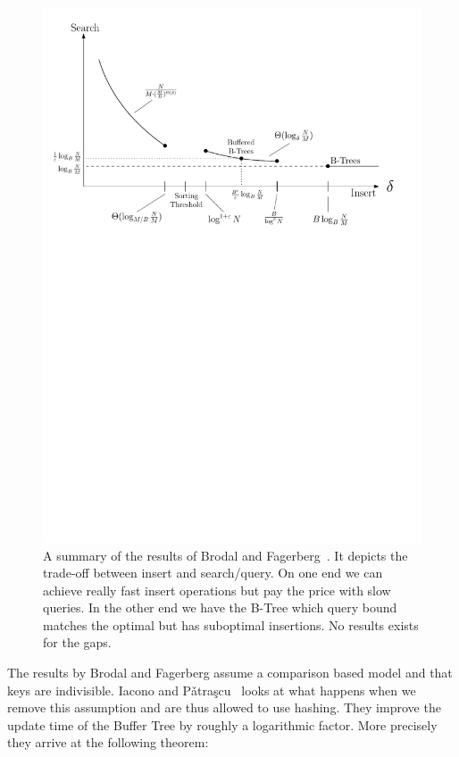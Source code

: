 \documentclass[twoside,11pt,openright]{report}
\begin{document}
\begin{figure}[t]
\centering
\includegraphics[width=\textwidth]{../figures/lower_bound_summary}
\caption{A summary of the results of Brodal and Fagerberg~\cite{Brodal:2003:LBE:644108.644201}. It depicts the trade-off between insert and search/query. On one end we can achieve really fast insert operations but pay the price with slow queries. In the other end we have the B-Tree which query bound matches the optimal but has suboptimal insertions. No results exists for the gaps.}
\label{fig:lower_bound_summary}
\end{figure}

The results by Brodal and Fagerberg assume a comparison based model and that keys are indivisible. Iacono and P\v{a}tra\c{s}cu~\cite{Iacono:2012:UHS:2095116.2095164} looks at what happens when we remove this assumption and are thus allowed to use hashing. They improve the update time of the Buffer Tree by roughly a logarithmic factor. More precisely they arrive at the following theorem:
\end{document}
